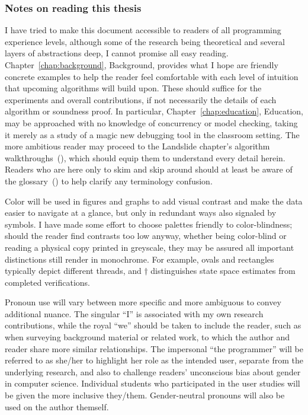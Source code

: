 \subsubsection{Notes on reading this thesis}

I have tried to make this document accessible to readers of all programming experience levels,
although some of the research being theoretical and several layers of abstractions deep,
I cannot promise all easy reading.
Chapter~\ref{chap:background}, Background, provides what I hope are friendly concrete examples
to help the reader feel comfortable with each level of intuition that upcoming algorithms will build upon.
These should suffice for the experiments and overall contributions,
if not necessarily the details of each algorithm or soundness proof.
In particular, Chapter~\ref{chap:education}, Education,
may be approached with no knowledge of concurrency or model checking,
taking it merely as a study of a magic new debugging tool in the classroom setting.
The more ambitious reader may proceed to the Landslide chapter's algorithm walkthroughs~(\sect{\ref{sec:landslide-algs}}),
which should equip them to understand every detail herein.
Readers who are here only to skim and skip around should at least be aware of the glossary~(\sect{\ref{sec:glossary}})
to help clarify any terminology confusion.

Color will be used in figures and graphs to add visual contrast and make the data easier to navigate at a glance,
but only in redundant ways also signaled by symbols.
I have made some effort to choose palettes friendly to color-blindness;
should the reader find contrasts too low anyway,
whether being color-blind or reading a physical copy printed in greyscale,
they may be assured all important distinctions still render in monochrome.
For example, ovals and rectangles typically depict different threads,
and $\dagger$ distinguishes state space estimates from completed verifications.

Pronoun use will vary between more specific and more ambiguous to convey additional nuance.
The singular ``I'' is associated with my own research contributions,
while the royal ``we'' should be taken to include the reader,
such as when surveying background material or related work,
to which the author and reader share more similar relationships.
The impersonal ``the programmer'' will be referred to as she/her
to highlight her role as the intended user, separate from the underlying research,
and also to challenge readers' unconscious bias about gender in computer science.
Individual students who participated in the user studies will be given the more inclusive they/them.
Gender-neutral pronouns will also be used on the author themself.

